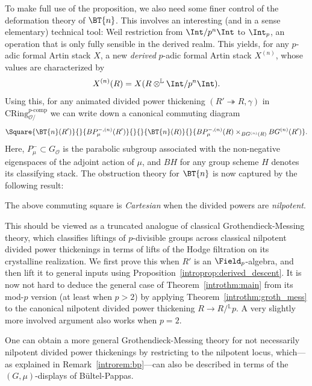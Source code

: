 \documentclass[10pt]{amsart}
\begin{document}
To make full use of the proposition, we also need some finer control of the deformation theory of $\BT{n}$. This involves an interesting (and in a sense elementary) technical tool: Weil restriction from $\Int/p^n\Int$ to $\Int_p$, an operation that is only fully sensible in the derived realm. This yields, for any $p$-adic formal Artin stack $X$, a new \emph{derived} $p$-adic formal Artin stack $X^{(n)}$, whose values are characterized by
\[
X^{(n)}(R) = X(R\otimes^{\mathbb{L}}\Int/p^n\Int).
\]
Using this, for any animated divided power thickening $(R'\twoheadrightarrow R,\gamma)$ in $\mathrm{CRing}^{p\text{-comp}}_{\mathcal{O}/}$ we can write down a canonical commuting diagram
\begin{equation}\label{eqn:commuting_square}
\Square{\BT{n}(R')}{}{BP^{-,(n)}_\mu(R')}{}{}{\BT{n}(R)}{}{BP^{-,(n)}_\mu(R)\times_{BG^{(n)}(R)}BG^{(n)}(R')}.
\end{equation}
Here, $P^{-}_\mu\subset G_{\mathcal{O}}$ is the parabolic subgroup associated with the non-negative eigenspaces of the adjoint action of $\mu$, and $BH$ for any group scheme $H$ denotes its classifying stack. The obstruction theory for $\BT{n}$ is now captured by the following result: 

\begin{introthm}
\label{introthm:groth_mess}
The above commuting square is \emph{Cartesian} when the divided powers are \emph{nilpotent}.
\end{introthm}

This should be viewed as a truncated analogue of classical Grothendieck-Messing theory, which classifies liftings of $p$-divisible groups across classical nilpotent divided power thickenings in terms of lifts of the Hodge filtration on its crystalline realization. We first prove this when $R'$ is an $\Field_p$-algebra, and then lift it to general inputs using Proposition~\ref{introprop:derived_descent}. It is now not hard to deduce the general case of Theorem~\ref{introthm:main} from its mod-$p$ version (at least when $p>2$) by applying Theorem~\ref{introthm:groth_mess} to the canonical nilpotent divided power thickening $R\to R/{}^{\mathbb{L}}p$. A very slightly more involved argument also works when $p=2$. 

One can obtain a more general Grothendieck-Messing theory for not necessarily nilpotent divided power thickenings by restricting to the nilpotent locus, which---as explained in Remark~\ref{introrem:bp}---can also be described in terms of the $(G,\mu)$-displays of B\"ultel-Pappas. 
\end{document}
